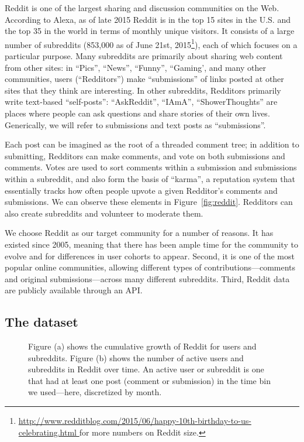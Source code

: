 Reddit is one of the largest sharing and discussion communities on the Web.  According to Alexa, as of late 2015 Reddit is in the top 15 sites in the U.S. and the top 35 in the world in terms of monthly unique visitors.  It consists of a large number of subreddits (853,000 as of June 21st, 2015\footnote{\url{http://www.redditblog.com/2015/06/happy-10th-birthday-to-us-celebrating.html }for more numbers on Reddit size.}), each of which focuses on a particular purpose.  Many subreddits are primarily about sharing web content from other sites: in ``Pics'', ``News'', ``Funny'', ``Gaming', and many other communities, users (``Redditors'') make ``submissions'' of links posted at other sites that they think are interesting.  In other subreddits, Redditors primarily write text-based ``self-posts'': ``AskReddit'', ``IAmA'', ``ShowerThoughts'' are places where people can ask questions and share stories of their own lives.  Generically, we will refer to submissions and text posts as ``submissions''.  

Each post can be imagined as the root of a threaded comment tree; in addition to submitting, Redditors can make comments, and vote on both submissions and comments.  Votes are used to sort comments within a submission and submissions within a subreddit, and also form the basis of ``karma'', a reputation system that essentially tracks how often people upvote a given Redditor's comments and submissions. We can observe these elements in Figure~\ref{fig:reddit}. Redditors can also create subreddits and volunteer to moderate them.

We choose Reddit as our target community for a number of reasons.  It has existed since 2005, meaning that there has been ample time for the community to evolve and for differences in user cohorts to appear.  Second, it is one of the most popular online communities, allowing different types of contributions---comments and original submissions---across many different subreddits. Third, Reddit data are publicly available through an API.

\subsection{The dataset}

\begin{figure}[!tb]
\centering
{}
\caption{Figure (a) shows the cumulative growth of Reddit for users and subreddits. Figure (b) shows the number of active users and subreddits in Reddit over time. An active user or subreddit is one that had at least one post (comment or submission) in the time bin we used---here, discretized by month.}
\label{fig:cumulative}
\end{figure}

